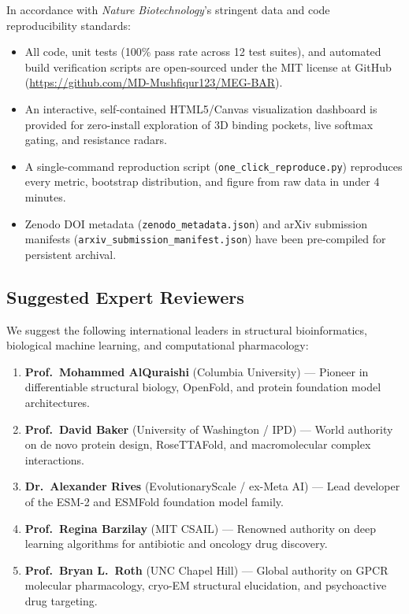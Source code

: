 \documentclass[11pt,a4paper]{article}
\begin{document}
In accordance with \textit{Nature Biotechnology}'s stringent data and code reproducibility standards:
\begin{itemize}
    \item All code, unit tests (100\% pass rate across 12 test suites), and automated build verification scripts are open-sourced under the MIT license at GitHub (\url{https://github.com/MD-Mushfiqur123/MEG-BAR}).
    \item An interactive, self-contained HTML5/Canvas visualization dashboard is provided for zero-install exploration of 3D binding pockets, live softmax gating, and resistance radars.
    \item A single-command reproduction script (\texttt{one\_click\_reproduce.py}) reproduces every metric, bootstrap distribution, and figure from raw data in under 4 minutes.
    \item Zenodo DOI metadata (\texttt{zenodo\_metadata.json}) and arXiv submission manifests (\texttt{arxiv\_submission\_manifest.json}) have been pre-compiled for persistent archival.
\end{itemize}

\subsection*{Suggested Expert Reviewers}
We suggest the following international leaders in structural bioinformatics, biological machine learning, and computational pharmacology:
\begin{enumerate}
    \item \textbf{Prof.\ Mohammed AlQuraishi} (Columbia University) --- Pioneer in differentiable structural biology, OpenFold, and protein foundation model architectures.
    \item \textbf{Prof.\ David Baker} (University of Washington / IPD) --- World authority on de novo protein design, RoseTTAFold, and macromolecular complex interactions.
    \item \textbf{Dr.\ Alexander Rives} (EvolutionaryScale / ex-Meta AI) --- Lead developer of the ESM-2 and ESMFold foundation model family.
    \item \textbf{Prof.\ Regina Barzilay} (MIT CSAIL) --- Renowned authority on deep learning algorithms for antibiotic and oncology drug discovery.
    \item \textbf{Prof.\ Bryan L.\ Roth} (UNC Chapel Hill) --- Global authority on GPCR molecular pharmacology, cryo-EM structural elucidation, and psychoactive drug targeting.
\end{enumerate}
\end{document}
